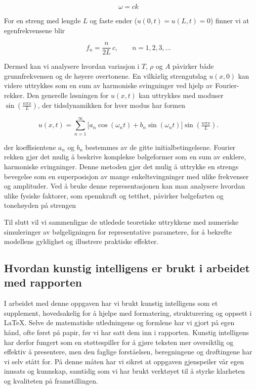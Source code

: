 \begin{equation*}
  \omega = c k
\end{equation*}

For en streng med lengde $L$ og faste ender ($u(0,t)=u(L,t)=0$) finner vi at egenfrekvensene blir

\begin{equation*}
  f_n = \frac{n}{2L}\,c, \qquad n=1,2,3,\dots \label{egenfrekvensene}
\end{equation*}

Dermed kan vi analysere hvordan variasjon i $T$, $\rho$ og $A$ påvirker både grunnfrekvensen og de høyere overtonene.
En vilkårlig strengutslag $u(x,0)$ kan videre uttrykkes som en sum av harmoniske svingninger ved hjelp av Fourier-rekker.
Den generelle løsningen for $u(x,t)$ kan uttrykkes med moduser 
$\sin\!\left(\tfrac{n\pi x}{L}\right)$, der tidsdynamikken for hver modus har formen 

\begin{equation*}
    u(x,t) = \sum_{n=1}^{\infty} \bigl[a_n \cos(\omega_n t) + b_n \sin(\omega_n t)\bigr] 
    \sin\!\left(\tfrac{n\pi x}{L}\right). \label{Fourierrekke}
\end{equation*}

der koeffisientene $a_n$ og $b_n$ bestemmes av de gitte initialbetingelsene.
Fourier rekken gjør det mulig å beskrive komplekse bølgeformer som en sum av enklere, harmoniske svingninger.  
Denne metoden gjør det mulig å uttrykke en strengs bevegelse som en superposisjon av mange enkeltsvingninger med ulike frekvenser og amplituder.  
Ved å bruke denne representasjonen kan man analysere hvordan ulike fysiske faktorer, som spennkraft og tetthet, påvirker bølgefarten og tonehøyden på strengen \parencite{libretextsWave}



Til slutt vil vi sammenligne de utledede teoretiske uttrykkene med numeriske simuleringer 
av bølgeligningen for representative parametere, for å bekrefte modellens gyldighet og illustrere praktiske effekter.

\subsection{Hvordan kunstig intelligens er brukt i arbeidet med rapporten}
I arbeidet med denne oppgaven har vi brukt kunstig intelligens som et supplement, hovedsakelig for å hjelpe med formatering, strukturering og oppsett i LaTeX. 
Selve de matematiske utledningene og formlene har vi gjort på egen hånd, ofte først på papir, før vi har satt dem inn i rapporten. 
Kunstig intelligens har derfor fungert som en støttespiller for å gjøre teksten mer oversiktlig og effektiv å presentere, men den faglige forståelsen, beregningene og drøftingene har vi selv stått for. 
På denne måten har vi sikret at oppgaven gjenspeiler vår egen innsats og kunnskap, samtidig som vi har brukt verktøyet til å styrke klarheten og kvaliteten på framstillingen.